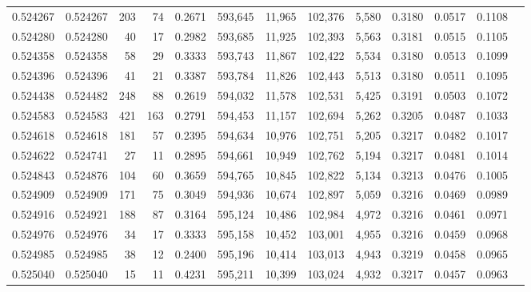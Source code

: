 \begin{tabular}{rrrrrrrrrrrrr}
0.524267 & 0.524267 &   203 &    74 &                                     0.2671 & 593,645 &  11,965 & 102,376 &   5,580 & 0.3180 & 0.0517 & 0.1108 \\
0.524280 & 0.524280 &    40 &    17 &                                     0.2982 & 593,685 &  11,925 & 102,393 &   5,563 & 0.3181 & 0.0515 & 0.1105 \\
0.524358 & 0.524358 &    58 &    29 &                                     0.3333 & 593,743 &  11,867 & 102,422 &   5,534 & 0.3180 & 0.0513 & 0.1099 \\
0.524396 & 0.524396 &    41 &    21 &                                     0.3387 & 593,784 &  11,826 & 102,443 &   5,513 & 0.3180 & 0.0511 & 0.1095 \\
0.524438 & 0.524482 &   248 &    88 &                                     0.2619 & 594,032 &  11,578 & 102,531 &   5,425 & 0.3191 & 0.0503 & 0.1072 \\
0.524583 & 0.524583 &   421 &   163 &                                     0.2791 & 594,453 &  11,157 & 102,694 &   5,262 & 0.3205 & 0.0487 & 0.1033 \\
0.524618 & 0.524618 &   181 &    57 &                                     0.2395 & 594,634 &  10,976 & 102,751 &   5,205 & 0.3217 & 0.0482 & 0.1017 \\
0.524622 & 0.524741 &    27 &    11 &                                     0.2895 & 594,661 &  10,949 & 102,762 &   5,194 & 0.3217 & 0.0481 & 0.1014 \\
0.524843 & 0.524876 &   104 &    60 &                                     0.3659 & 594,765 &  10,845 & 102,822 &   5,134 & 0.3213 & 0.0476 & 0.1005 \\
0.524909 & 0.524909 &   171 &    75 &                                     0.3049 & 594,936 &  10,674 & 102,897 &   5,059 & 0.3216 & 0.0469 & 0.0989 \\
0.524916 & 0.524921 &   188 &    87 &                                     0.3164 & 595,124 &  10,486 & 102,984 &   4,972 & 0.3216 & 0.0461 & 0.0971 \\
0.524976 & 0.524976 &    34 &    17 &                                     0.3333 & 595,158 &  10,452 & 103,001 &   4,955 & 0.3216 & 0.0459 & 0.0968 \\
0.524985 & 0.524985 &    38 &    12 &                                     0.2400 & 595,196 &  10,414 & 103,013 &   4,943 & 0.3219 & 0.0458 & 0.0965 \\
0.525040 & 0.525040 &    15 &    11 &                                     0.4231 & 595,211 &  10,399 & 103,024 &   4,932 & 0.3217 & 0.0457 & 0.0963 \\

\end{tabular}

